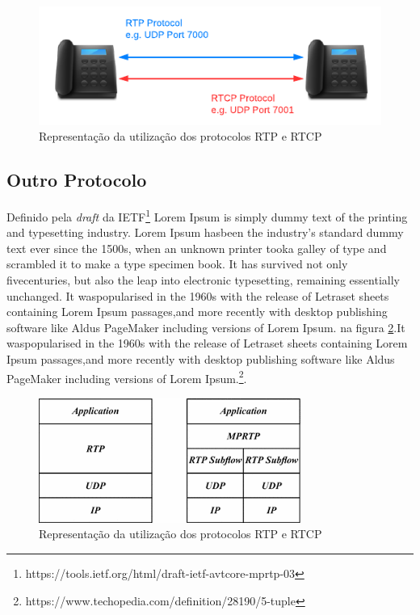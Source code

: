 \documentclass[
	12pt,				%
	openright,			%
	oneside,			%
	a4paper,			%
	chapter=TITLE,		%
	english,			%
	brazil,				%
	]{abntex2}
\begin{document}
\begin{figure}[!htb]
\begin{center}
\caption{Representação da utilização dos protocolos RTP e RTCP }
\label{fig:gy80}
\includegraphics[width=0.6\linewidth]{rtp-rtcp.png}
\end{center}
\end{figure}

\subsection{Outro Protocolo}
Definido pela  \textit{draft} da IETF\footnote{https://tools.ietf.org/html/draft-ietf-avtcore-mprtp-03} Lorem Ipsum is simply dummy text of the printing and typesetting industry. Lorem Ipsum hasbeen the industry’s standard dummy text ever since the 1500s, when an unknown printer tooka galley of type and scrambled it to make a type specimen book. It has survived not only fivecenturies, but also the leap into electronic typesetting, remaining essentially unchanged. It waspopularised in the 1960s with the release of Letraset sheets containing Lorem Ipsum passages,and more recently with desktop publishing software like Aldus PageMaker including versions of Lorem Ipsum. \cite{herrero2017modeling} na figura \ref{fig:rtp-mprtp}.It waspopularised in the 1960s with the release of Letraset sheets containing Lorem Ipsum passages,and more recently with desktop publishing software like Aldus PageMaker including versions of Lorem Ipsum.\footnote{https://www.techopedia.com/definition/28190/5-tuple}. 

\begin{figure}[!htb]
\begin{center}
\caption{Representação da utilização dos protocolos RTP e RTCP }
\label{fig:rtp-mprtp}
\includegraphics[width=0.6\linewidth]{rtp-mprtp.png}
\end{center}
\end{figure}
\end{document}
